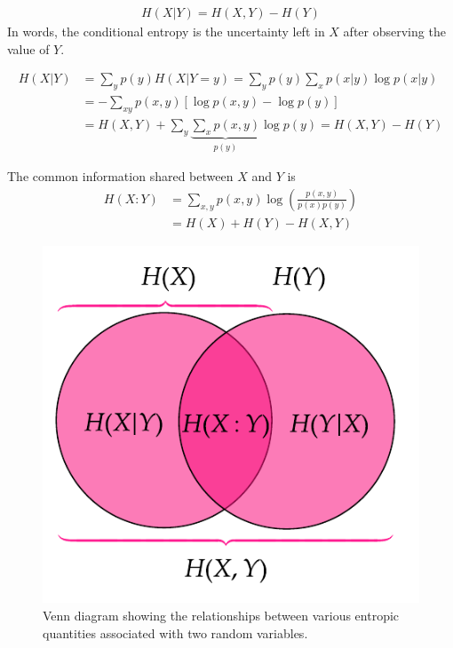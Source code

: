\begin{lemma}\label{}
	\begin{align}
		H(X|Y) = H(X,Y) - H(Y)
	\end{align}
	In words, the conditional entropy is the uncertainty left in $X$ after observing the value of $Y$.
\end{lemma}
	
\begin{align}
	H(X|Y) &= \sum_y p(y)H(X|Y=y) 
		= \sum_y p(y) \sum_x p(x|y) \log p(x|y) \\
		&= -\sum_{xy} p(x,y) [\log p(x,y)-\log p(y)] \\
		&= H(X,Y) + \sum_y \underbrace{\sum_x p(x,y)}_{p(y)} \log p(y) 
		= \boxed{H(X,Y) - H(Y)}
\end{align}

\begin{definition}\leavevmode
	The common information shared between $X$ and $Y$ is
	\begin{align}
		H(X:Y) &= \sum_{x,y}p(x,y)\log\left(\frac{p(x,y)}{p(x)p(y)}\right) \\
			&= H(X) + H(Y) - H(X,Y)
	\end{align}
\end{definition}

\begin{figure}[h]
	\centering
	\label{}
	\includegraphics[scale=0.8]{fig/venn-entropy.pdf}
	\caption{Venn diagram showing the relationships between various entropic quantities associated with two random variables.}
\end{figure}